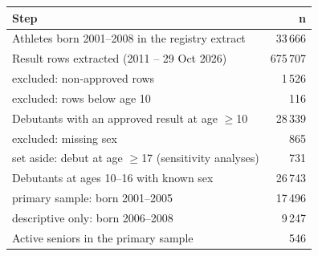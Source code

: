 \begin{tabular}{lr}
\toprule
Step & n \\
\midrule
Athletes born 2001--2008 in the registry extract & 33\,666 \\
Result rows extracted (2011 -- 29 Oct 2026) & 675\,707 \\
\quad excluded: non-approved rows & 1\,526 \\
\quad excluded: rows below age 10 & 116 \\
Debutants with an approved result at age $\geq$10 & 28\,339 \\
\quad excluded: missing sex & 865 \\
\quad set aside: debut at age $\geq$17 (sensitivity analyses) & 731 \\
Debutants at ages 10--16 with known sex & 26\,743 \\
\quad primary sample: born 2001--2005 & 17\,496 \\
\quad descriptive only: born 2006--2008 & 9\,247 \\
Active seniors in the primary sample & 546 \\
\bottomrule
\end{tabular}
